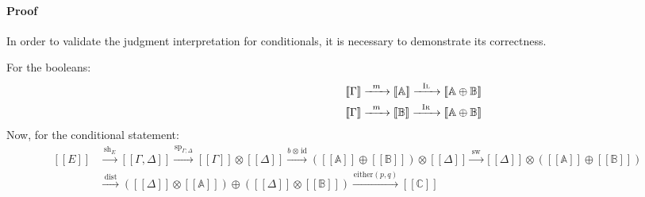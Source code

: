 \paragraph{Proof} In order to validate the judgment interpretation for conditionals, it is necessary to demonstrate its correctness.

For the booleans: 
\begin{equation} \label{eq:proof_bool}
 \begin{aligned} 
    \hspace{120pt}&  [\![\Gamma ]\!]   \xrightarrow{\hspace{5pt}m\hspace{5pt}} [\![\mathbb{A} ]\!] \xrightarrow{\hspace{6pt}\textsc{Il}\hspace{6pt}} [\![\mathbb{A} \oplus \mathbb{B}]\!] \\ 
     &[\![\Gamma ]\!]   \xrightarrow{\hspace{5pt}m\hspace{5pt}} [\![\mathbb{B} ]\!] \xrightarrow{\hspace{6pt}\textsc{Ir}\hspace{6pt}} [\![\mathbb{A} \oplus \mathbb{B}]\!]
\end{aligned}   
\end{equation}
Now, for the conditional statement:
\begin{equation} \label{eq:proof_bool_2}
 \begin{aligned} 
    [\![E]\!] & \xrightarrow{\hspace{2pt}\text{sh}_{E}\hspace{2pt}}   [\![\Gamma,\Delta ]\!]   \xrightarrow{\hspace{1pt}\text{sp}_{\Gamma;\Delta}\hspace{1pt}}  [\![\Gamma ]\!] \otimes [\![\Delta ]\!] \xrightarrow{ b \hspace{1pt} \otimes \hspace{1pt} \text{id}} ([\![\mathbb{A} ]\!] \oplus [\![\mathbb{B} ]\!]) \otimes [\![\Delta ]\!] \xrightarrow{\hspace{2pt}\text{sw}\hspace{2pt}}  [\![\Delta ]\!] \otimes ([\![\mathbb{A} ]\!] \oplus [\![\mathbb{B} ]\!])  \\
    & \xrightarrow{\hspace{3pt}\text{dist}\hspace{3pt}} ([\![\Delta ]\!] \otimes [\![\mathbb{A} ]\!]  ) \oplus (  [\![\Delta ]\!] \otimes [\![\mathbb{B} ]\!] ) \xrightarrow{\hspace{1pt}\text{either}(p,q)\hspace{1pt}} [\![\mathbb{C} ]\!]
\end{aligned}   
\end{equation}


